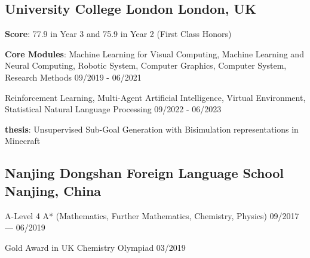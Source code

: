 
\subsection{
    University College London 
    \hfill London, UK
}
    \begin{zitemize}
        \item   \textbf{Score}: 77.9 in Year 3 and 75.9 in Year 2 (First Class Honors)
        \item   \textbf{Core Modules}: Machine Learning for Visual Computing, 
                Machine Learning and Neural Computing, 
                Robotic System, 
                Computer Graphics, 
                Computer System,
                Research Methods 
                \hfill 09/2019 - 06/2021
        \item   Reinforcement Learning,    
                Multi-Agent Artificial Intelligence,
                Virtual Environment,
                Statistical Natural Language Processing
                \hfill 09/2022 - 06/2023
        \item   \textbf{thesis}: Unsupervised Sub-Goal Generation with Bisimulation representations in Minecraft
    \end{zitemize}

\vspace{0.3em}


\subsection{
    Nanjing Dongshan Foreign Language School 
    \hfill Nanjing, China
}
    \begin{zitemize}
        \item   A-Level 4 A* (Mathematics, Further Mathematics, Chemistry, Physics) 
                \hfill 09/2017 --- 06/2019 
        \item   Gold Award in UK Chemistry Olympiad
                \hfill 03/2019
    \end{zitemize}


